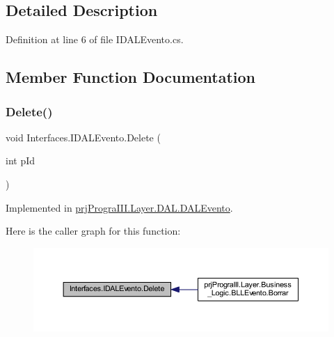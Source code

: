 \subsection{Detailed Description}


Definition at line 6 of file I\+D\+A\+L\+Evento.\+cs.



\subsection{Member Function Documentation}
\hypertarget{interface_interfaces_1_1_i_d_a_l_evento_a8d651965fc1b755f5409a8f05fc293c3}{}\label{interface_interfaces_1_1_i_d_a_l_evento_a8d651965fc1b755f5409a8f05fc293c3} 
\subsubsection{\texorpdfstring{Delete()}{Delete()}}
{\footnotesize\ttfamily void Interfaces.\+I\+D\+A\+L\+Evento.\+Delete (\begin{DoxyParamCaption}\item[{int}]{p\+Id }\end{DoxyParamCaption})}



Implemented in \hyperlink{classprj_progra_i_i_i_1_1_layer_1_1_d_a_l_1_1_d_a_l_evento_a269652e78dd2e186b0b330c250a90cda}{prj\+Progra\+I\+I\+I.\+Layer.\+D\+A\+L.\+D\+A\+L\+Evento}.

Here is the caller graph for this function\+:
\nopagebreak
\begin{figure}[H]
\begin{center}
\leavevmode
\includegraphics[width=350pt]{interface_interfaces_1_1_i_d_a_l_evento_a8d651965fc1b755f5409a8f05fc293c3_icgraph}
\end{center}
\end{figure}
\hypertarget{interface_interfaces_1_1_i_d_a_l_evento_a2a6665c82b5721edc25723109e1add77}{}\label{interface_interfaces_1_1_i_d_a_l_evento_a2a6665c82b5721edc25723109e1add77} 
